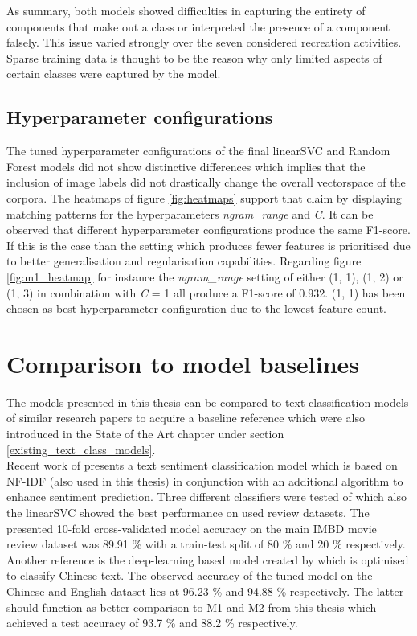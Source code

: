As summary, both models showed difficulties in capturing the entirety of components that make out a class or interpreted the presence of a component falsely. This issue varied strongly over the seven considered recreation activities. Sparse training data is thought to be the reason why only limited aspects of certain classes were captured by the model.

\subsection{Hyperparameter configurations}
The tuned hyperparameter configurations of the final linearSVC and Random Forest models did not show distinctive differences which implies that the inclusion of image labels did not drastically change the overall vectorspace of the corpora. The heatmaps of figure \ref{fig:heatmaps} support that claim by displaying matching patterns for the hyperparameters \textit{ngram\_range} and \textit{C}. It can be observed that different hyperparameter configurations produce the same F1-score. If this is the case than the setting which produces fewer features is prioritised due to better generalisation and regularisation capabilities. Regarding figure \ref{fig:m1_heatmap} for instance the \textit{ngram\_range} setting of either (1, 1), (1, 2) or (1, 3) in combination with \textit{C} = 1 all produce a F1-score of 0.932. (1, 1) has been chosen as best hyperparameter configuration due to the lowest feature count.

\section{Comparison to model baselines} \label{model_baseline}
The models presented in this thesis can be compared to text-classification models of similar research papers to acquire a baseline reference which were also introduced in the State of the Art chapter under section \ref{existing_text_class_models}. \\
Recent work of \textcite{Das2018} presents a text sentiment classification model which is based on NF-IDF (also used in this thesis) in conjunction with an additional algorithm to enhance sentiment prediction. Three different classifiers were tested of which also the linearSVC showed the best performance on used review datasets. The presented 10-fold cross-validated model accuracy on the main IMBD movie review dataset was 89.91 \% with a train-test split of 80 \% and 20 \% respectively.\\
Another reference is the deep-learning based model created by \textcite{Li2018} which is optimised to classify Chinese text. The observed accuracy of the tuned model on the Chinese and English dataset lies at 96.23 \% and 94.88 \% respectively. The latter should function as better comparison to M1 and M2 from this thesis which achieved a test accuracy of 93.7 \% and 88.2 \% respectively.

